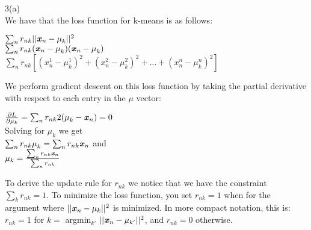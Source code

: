 \documentclass[12pt]{scrartcl}
\begin{document}
3(a) \\

We have that the loss function for k-means is as follows: \\

\begin{center}
$\sum_n r_{nk} ||\textbf{\textit{x}}_n - \textit{\textbf{$\mu$}}_k||^2$  \\
$\sum_n r_{nk} (\textbf{\textit{x}}_n - \textit{\textbf{$\mu$}}_k)(\textbf{\textit{x}}_n - \textit{\textbf{$\mu$}}_k)$ \\
$\sum_n r_{nk} [(x_n^1 - \mu_k^1)^2 + (x_n^2 - \mu_k^2)^2 + \ldots + (x_n^n - \mu_k^n)^2]$ \\
\end{center}


We perform gradient descent on this loss function by taking the partial derivative with respect to each entry in the \textbf{\textit{$\mu$}} vector: \\

\begin{center}
$\frac{\partial L}{\partial \mu_k} = \sum_n r_{nk} 2(\textbf{\textit{$\mu$}}_k - \textbf{\textit{x}}_n) = 0$\\

Solving for $\mu_k$ we get \\

$\sum_n r_{nk} \textbf{\textit{$\mu$}}_k = \sum_n r_{nk} \textbf{\textit{x}}_n$ and \\
$\mu_k = \frac{\sum_n r_{nk} \textbf{\textit{x}}_n}{\sum_n r_{nk}}$
\end{center}

To derive the update rule for $r_{nk}$ we notice that we have the constraint $\sum_k r_{nk} = 1$. To minimize the loss function, you set $r_{nk} = 1$ when for the argument where $||\textbf{\textit{x}}_n - \mu_k||^2$ is minimized. In more compact notation, this is: \\

$r_{nk} = 1$ for $k = $ argmin$_{k'}$ $||\textbf{\textit{x}}_n - \mu_{k'}||^2$, and $r_{nk} = 0 $ otherwise.
\end{document}
